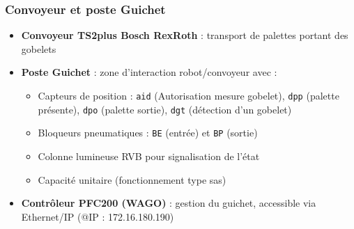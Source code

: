 \subsubsection{Convoyeur et poste Guichet}
\begin{itemize}
    \item \textbf{Convoyeur TS2plus Bosch RexRoth} : transport de palettes portant des gobelets
    \item \textbf{Poste Guichet} : zone d'interaction robot/convoyeur avec :
    \begin{itemize}
        \item Capteurs de position : \texttt{aid} (Autorisation mesure gobelet), \texttt{dpp} (palette présente), \texttt{dpo} (palette sortie), \texttt{dgt} (détection d'un gobelet)
        \item Bloqueurs pneumatiques : \texttt{BE} (entrée) et \texttt{BP} (sortie)
        \item Colonne lumineuse RVB pour signalisation de l'état
        \item Capacité unitaire (fonctionnement type sas)
    \end{itemize}
    \item \textbf{Contrôleur PFC200 (WAGO)} : gestion du guichet, accessible via Ethernet/IP (@IP : 172.16.180.190)
\end{itemize}

